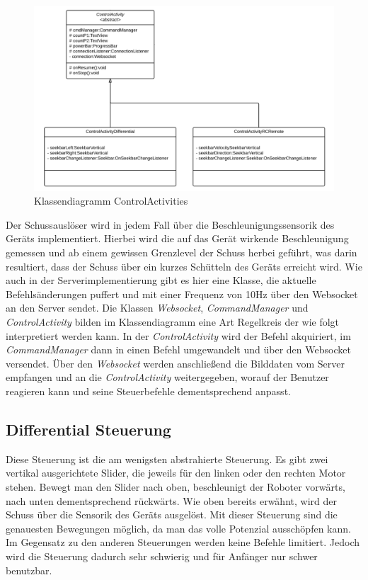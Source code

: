 \begin{figure}[!h]
	\includegraphics[width=\textwidth]{images/uml_controlactivity_android.pdf}
	\caption{Klassendiagramm ControlActivities}
	\label{fig:uml_controlactivity_android}
\end{figure}

Der Schussauslöser wird in jedem Fall über die Beschleunigungssensorik des Geräts implementiert. Hierbei wird die auf das Gerät wirkende Beschleunigung gemessen und ab einem gewissen Grenzlevel der Schuss herbei geführt, was darin resultiert, dass der Schuss über ein kurzes Schütteln des Geräts erreicht wird.
Wie auch in der Serverimplementierung gibt es hier eine Klasse, die aktuelle Befehlsänderungen puffert und mit einer Frequenz von 10Hz über den Websocket an den Server sendet.
Die Klassen \textit{Websocket}, \textit{CommandManager} und \textit{ControlActivity} bilden im Klassendiagramm eine Art Regelkreis der wie folgt interpretiert werden kann. In der \textit{ControlActivity} wird der Befehl akquiriert, im \textit{CommandManager} dann in einen Befehl umgewandelt und über den Websocket versendet. Über den \textit{Websocket} werden anschließend die Bilddaten vom Server empfangen und an die \textit{ControlActivity} weitergegeben, worauf der Benutzer reagieren kann und seine Steuerbefehle dementsprechend anpasst.
 

\subsection{Differential Steuerung}
\label{sec:differentialsteuerung}

Diese Steuerung ist die am wenigsten abstrahierte Steuerung. Es gibt zwei vertikal ausgerichtete Slider, die jeweils für den linken oder den rechten Motor stehen. Bewegt man den Slider nach oben, beschleunigt der Roboter vorwärts, nach unten dementsprechend rückwärts. Wie oben bereits erwähnt, wird der Schuss über die Sensorik des Geräts ausgelöst. Mit dieser Steuerung sind die genauesten Bewegungen möglich, da man das volle Potenzial ausschöpfen kann. Im Gegensatz zu den anderen Steuerungen werden keine Befehle limitiert. Jedoch wird die Steuerung dadurch sehr schwierig und für Anfänger nur schwer benutzbar.

